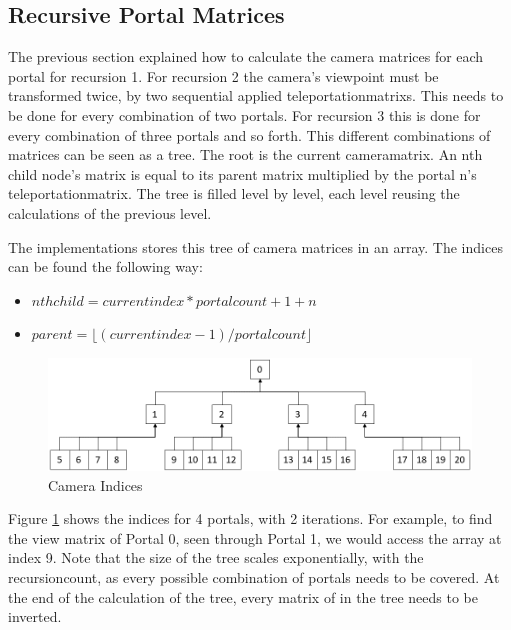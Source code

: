 \subsection{Recursive Portal Matrices}
\label{section:recursivecameramatrices}
The previous section explained how to calculate the camera matrices for each portal for recursion 1. For recursion 2 the camera's viewpoint must be transformed twice, by two sequential applied \glspl{teleportationmatrix}. This needs to be done for every combination of two portals. For recursion 3 this is done for every combination of three portals and so forth. This different combinations of matrices can be seen as a tree. The root is the current \gls{cameramatrix}. An nth child node's matrix is equal to its parent matrix multiplied by the portal n's \gls{teleportationmatrix}. The tree is filled level by level, each level reusing the calculations of the previous level.




The implementations stores this tree of camera matrices in an array. The indices can be found the following way:

\begin{itemize}
	\item $ nth child = current index * portalcount + 1 + n$
	\item $ parent = \lfloor(current index-1)/portal count\rfloor $
\end{itemize}




\begin{figure}[h]
	\includegraphics[width=\linewidth]{images/cameraindices.png}
	\caption{Camera Indices}
	\label{fig:cameraindices}
\end{figure}

Figure \ref{fig:cameraindices} shows the indices for 4 portals, with 2 iterations. For example, to find the view matrix of Portal 0, seen through Portal 1, we would access the array at index 9. Note that the size of the tree scales exponentially, with the \gls{recursioncount}, as every possible combination of portals needs to be covered. At the end of the calculation of the tree, every matrix of in the tree needs to be inverted.


